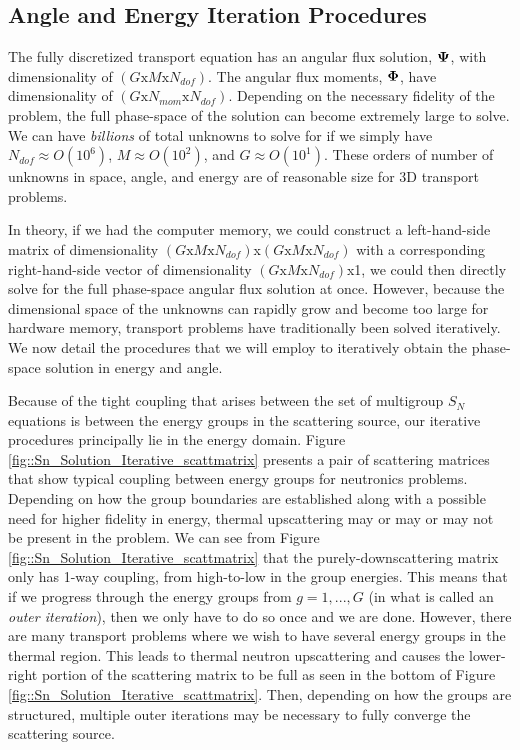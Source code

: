 \subsection{Angle and Energy Iteration Procedures}
\label{sec::Sn_Solution_Iterative}

The fully discretized transport equation has an angular flux solution, ${\bf \Psi}$, with dimensionality of $(G \text{x} M \text{x} N_{dof})$. The angular flux moments, ${\bf \Phi}$, have dimensionality of $(G \text{x} N_{mom} \text{x} N_{dof})$. Depending on the necessary fidelity of the problem, the full phase-space of the solution can become extremely large to solve. We can have {\em billions} of total unknowns to solve for if we simply have $N_{dof} \approx O(10^6)$, $M \approx O(10^2)$, and $G \approx O(10^1)$. These orders of number of unknowns in space, angle, and energy are of reasonable size for 3D transport problems.

In theory, if we had the computer memory, we could construct a left-hand-side matrix of dimensionality $(G \text{x} M \text{x} N_{dof})$x$(G \text{x} M \text{x} N_{dof})$ with a corresponding right-hand-side vector of dimensionality $(G \text{x} M \text{x} N_{dof})$x1, we could then directly solve for the full phase-space angular flux solution at once. However, because the dimensional space of the unknowns can rapidly grow and become too large for hardware memory, transport problems have traditionally been solved iteratively. We now detail the procedures that we will employ to iteratively obtain the phase-space solution in energy and angle.

Because of the tight coupling that arises between the set of multigroup $S_N$ equations is between the energy groups in the scattering source, our iterative procedures principally lie in the energy domain. Figure \ref{fig::Sn_Solution_Iterative_scattmatrix} presents a pair of scattering matrices that show typical coupling between energy groups for neutronics problems. Depending on how the group boundaries are established along with a possible need for higher fidelity in energy, thermal upscattering may or may or may not be present in the problem. We can see from Figure \ref{fig::Sn_Solution_Iterative_scattmatrix} that the purely-downscattering matrix only has 1-way coupling, from high-to-low in the group energies. This means that if we progress through the energy groups from $g=1,...,G$ (in what is called an {\em outer iteration}), then we only have to do so once and we are done. However, there are many transport problems where we wish to have several energy groups in the thermal region. This leads to thermal neutron upscattering and causes the lower-right portion of the scattering matrix to be full as seen in the bottom of Figure \ref{fig::Sn_Solution_Iterative_scattmatrix}. Then, depending on how the groups are structured, multiple outer iterations may be necessary to fully converge the scattering source.


